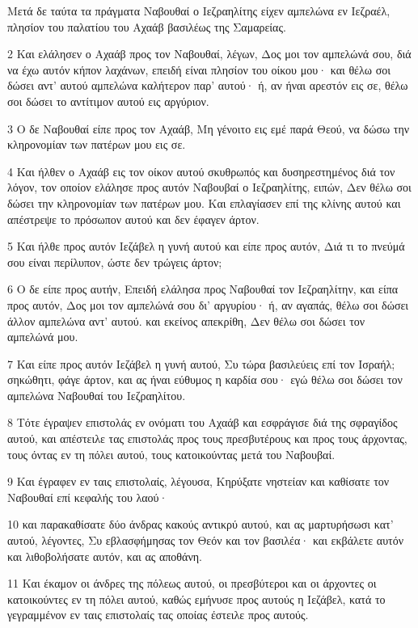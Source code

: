 \par Μετά δε ταύτα τα πράγματα Ναβουθαί ο Ιεζραηλίτης είχεν αμπελώνα εν Ιεζραέλ, πλησίον του παλατίου του Αχαάβ βασιλέως της Σαμαρείας.
\par 2 Και ελάλησεν ο Αχαάβ προς τον Ναβουθαί, λέγων, Δος μοι τον αμπελώνά σου, διά να έχω αυτόν κήπον λαχάνων, επειδή είναι πλησίον του οίκου μου· και θέλω σοι δώσει αντ' αυτού αμπελώνα καλήτερον παρ' αυτού· ή, αν ήναι αρεστόν εις σε, θέλω σοι δώσει το αντίτιμον αυτού εις αργύριον.
\par 3 Ο δε Ναβουθαί είπε προς τον Αχαάβ, Μη γένοιτο εις εμέ παρά Θεού, να δώσω την κληρονομίαν των πατέρων μου εις σε.
\par 4 Και ήλθεν ο Αχαάβ εις τον οίκον αυτού σκυθρωπός και δυσηρεστημένος διά τον λόγον, τον οποίον ελάλησε προς αυτόν Ναβουβαί ο Ιεζραηλίτης, ειπών, Δεν θέλω σοι δώσει την κληρονομίαν των πατέρων μου. Και επλαγίασεν επί της κλίνης αυτού και απέστρεψε το πρόσωπον αυτού και δεν έφαγεν άρτον.
\par 5 Και ήλθε προς αυτόν Ιεζάβελ η γυνή αυτού και είπε προς αυτόν, Διά τι το πνεύμά σου είναι περίλυπον, ώστε δεν τρώγεις άρτον;
\par 6 Ο δε είπε προς αυτήν, Επειδή ελάλησα προς Ναβουθαί τον Ιεζραηλίτην, και είπα προς αυτόν, Δος μοι τον αμπελώνά σου δι' αργυρίου· ή, αν αγαπάς, θέλω σοι δώσει άλλον αμπελώνα αντ' αυτού. και εκείνος απεκρίθη, Δεν θέλω σοι δώσει τον αμπελώνά μου.
\par 7 Και είπε προς αυτόν Ιεζάβελ η γυνή αυτού, Συ τώρα βασιλεύεις επί τον Ισραήλ; σηκώθητι, φάγε άρτον, και ας ήναι εύθυμος η καρδία σου· εγώ θέλω σοι δώσει τον αμπελώνα Ναβουθαί του Ιεζραηλίτου.
\par 8 Τότε έγραψεν επιστολάς εν ονόματι του Αχαάβ και εσφράγισε διά της σφραγίδος αυτού, και απέστειλε τας επιστολάς προς τους πρεσβυτέρους και προς τους άρχοντας, τους όντας εν τη πόλει αυτού, τους κατοικούντας μετά του Ναβουβαί.
\par 9 Και έγραφεν εν ταις επιστολαίς, λέγουσα, Κηρύξατε νηστείαν και καθίσατε τον Ναβουθαί επί κεφαλής του λαού·
\par 10 και παρακαθίσατε δύο άνδρας κακούς αντικρύ αυτού, και ας μαρτυρήσωσι κατ' αυτού, λέγοντες, Συ εβλασφήμησας τον Θεόν και τον βασιλέα· και εκβάλετε αυτόν και λιθοβολήσατε αυτόν, και ας αποθάνη.
\par 11 Και έκαμον οι άνδρες της πόλεως αυτού, οι πρεσβύτεροι και οι άρχοντες οι κατοικούντες εν τη πόλει αυτού, καθώς εμήνυσε προς αυτούς η Ιεζάβελ, κατά το γεγραμμένον εν ταις επιστολαίς τας οποίας έστειλε προς αυτούς.
